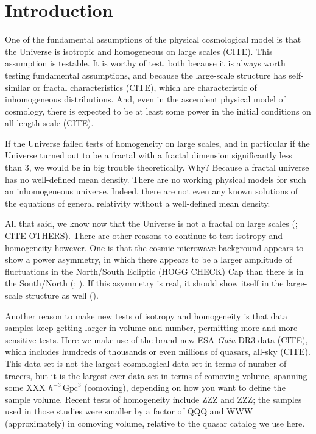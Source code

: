 \documentclass[modern]{aastex631}
\newcommand{\unit}[1]{\mathrm{#1}}
\newcommand{\Gpc}{\unit{Gpc}}
\begin{document}
\section{Introduction}\label{sec:intro}\noindent
One of the fundamental assumptions of the physical cosmological model is that the Universe is isotropic and homogeneous on large scales (CITE).
This assumption is testable.
It is worthy of test, both because it is always worth testing fundamental assumptions, and because the large-scale structure has self-similar or fractal characteristics (CITE), which are characteristic of inhomogeneous distributions.
And, even in the ascendent physical model of cosmology, there is expected to be at least some power in the initial conditions on all length scale (CITE).

If the Universe failed tests of homogeneity on large scales, and in particular if the Universe turned out to be a fractal with a fractal dimension significantly less than 3, we would be in big trouble theoretically.
Why?
Because a fractal universe has no well-defined mean density.
There are no working physical models for such an inhomogeneous universe.
Indeed, there are not even any known solutions of the equations of general relativity without a well-defined mean density.

All that said, we know now that the Universe is not a fractal on large scales (\citealt{hogg05}; CITE OTHERS).
There are other reasons to continue to test isotropy and homogeneity however.
One is that the cosmic microwave background appears to show a power asymmetry, in which there appears to be a larger amplitude of fluctuations in the North/South Ecliptic (HOGG CHECK) Cap than there is in the South/North (\citealt{wmapanisotropy}; \citealt{planckanisotropy}).
If this asymmetry is real, it should show itself in the large-scale structure as well (\citealt{zhai}).

Another reason to make new tests of isotropy and homogeneity is that data samples keep getting larger in volume and number, permitting more and more sensitive tests.
Here we make use of the brand-new ESA \textsl{Gaia} DR3 data (CITE), which includes hundreds of thousands or even millions of quasars, all-sky (CITE).
This data set is not the largest cosmological data set in terms of number of tracers, but it is the largest-ever data set in terms of comoving volume, spanning some XXX $h^{-3}\,\Gpc^3$ (comoving), depending on how you want to define the sample volume.
Recent tests of homogeneity include ZZZ and ZZZ; the samples used in those studies were smaller by a factor of QQQ and WWW (approximately) in comoving volume, relative to the quasar catalog we use here.
\end{document}

